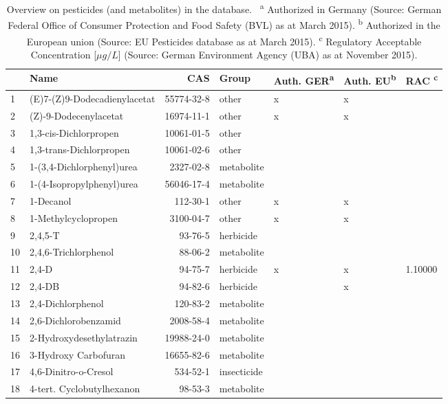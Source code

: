 \begin{longtable}{lp{4cm}rlp{1.3cm}p{1.3cm}p{1.5cm}}
\caption[Overview on pesticides in the database.]{Overview on pesticides (and metabolites) in the database. \
                    \textsuperscript{a} Authorized in Germany (Source: German Federal Office of Consumer Protection and Food Safety (BVL) as at March 2015). 
                    \textsuperscript{b} Authorized in the European union (Source: EU Pesticides database as at March 2015).
                    \textsuperscript{c} Regulatory Acceptable Concentration [$\mu g/L$] (Source: German Environment Agency (UBA) as at November 2015).} \\ 
  \toprule
 & Name & CAS & Group & Auth. GER\textsuperscript{a} & Auth. EU\textsuperscript{b} & RAC \textsuperscript{c} \\ 
  \midrule
1 & (E)7-(Z)9-Dodecadienylacetat & 55774-32-8 & other & x & x &  \\ 
  2 & (Z)-9-Dodecenylacetat & 16974-11-1 & other & x & x &  \\ 
  3 & 1,3-cis-Dichlorpropen & 10061-01-5 & other &  &  &  \\ 
  4 & 1,3-trans-Dichlorpropen & 10061-02-6 & other &  &  &  \\ 
  5 & 1-(3,4-Dichlorphenyl)urea & 2327-02-8 & metabolite &  &  &  \\ 
  6 & 1-(4-Isopropylphenyl)urea & 56046-17-4 & metabolite &  &  &  \\ 
  7 & 1-Decanol & 112-30-1 & other & x & x &  \\ 
  8 & 1-Methylcyclopropen & 3100-04-7 & other & x & x &  \\ 
  9 & 2,4,5-T & 93-76-5 & herbicide &  &  &  \\ 
  10 & 2,4,6-Trichlorphenol & 88-06-2 & metabolite &  &  &  \\ 
  11 & 2,4-D & 94-75-7 & herbicide & x & x & 1.10000 \\ 
  12 & 2,4-DB & 94-82-6 & herbicide &  & x &  \\ 
  13 & 2,4-Dichlorphenol & 120-83-2 & metabolite &  &  &  \\ 
  14 & 2,6-Dichlorobenzamid & 2008-58-4 & metabolite &  &  &  \\ 
  15 & 2-Hydroxydesethylatrazin & 19988-24-0 & metabolite &  &  &  \\ 
  16 & 3-Hydroxy Carbofuran & 16655-82-6 & metabolite &  &  &  \\ 
  17 & 4,6-Dinitro-o-Cresol & 534-52-1 & insecticide &  &  &  \\ 
  18 & 4-tert. Cyclobutylhexanon & 98-53-3 & metabolite &  &  &  \\ 

\end{longtable}

